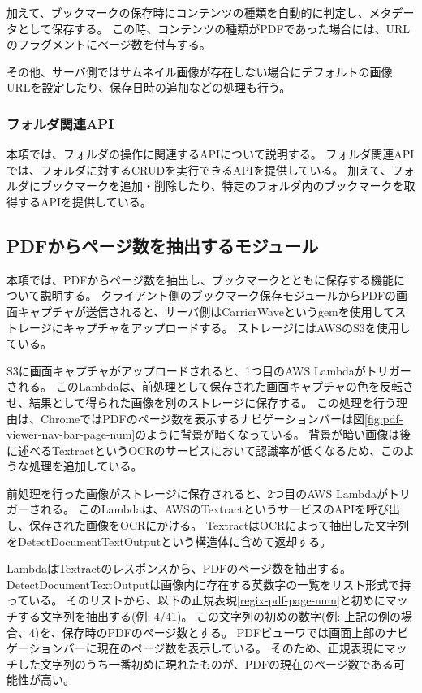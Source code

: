 加えて、ブックマークの保存時にコンテンツの種類を自動的に判定し、メタデータとして保存する。
この時、コンテンツの種類がPDFであった場合には、URLのフラグメントにページ数を付与する。

その他、サーバ側ではサムネイル画像が存在しない場合にデフォルトの画像URLを設定したり、保存日時の追加などの処理も行う。

\subsubsection{フォルダ関連API}
本項では、フォルダの操作に関連するAPIについて説明する。
フォルダ関連APIでは、フォルダに対するCRUDを実行できるAPIを提供している。
加えて、フォルダにブックマークを追加・削除したり、特定のフォルダ内のブックマークを取得するAPIを提供している。

\subsection{PDFからページ数を抽出するモジュール}
本項では、PDFからページ数を抽出し、ブックマークとともに保存する機能について説明する。
クライアント側のブックマーク保存モジュールからPDFの画面キャプチャが送信されると、サーバ側はCarrierWave\cite{carrier-wave}というgemを使用してストレージにキャプチャをアップロードする。
ストレージにはAWSのS3\cite{s3}を使用している。

S3に画面キャプチャがアップロードされると、1つ目のAWS Lambdaがトリガーされる。
このLambdaは、前処理として保存された画面キャプチャの色を反転させ、結果として得られた画像を別のストレージに保存する。
この処理を行う理由は、ChromeではPDFのページ数を表示するナビゲーションバーは図\ref{fig:pdf-viewer-nav-bar-page-num}のように背景が暗くなっている。
背景が暗い画像は後に述べるTextract\cite{textract}というOCRのサービスにおいて認識率が低くなるため、このような処理を追加している。

前処理を行った画像がストレージに保存されると、2つ目のAWS Lambdaがトリガーされる。
このLambdaは、AWSのTextractというサービスのAPIを呼び出し、保存された画像をOCRにかける。
TextractはOCRによって抽出した文字列をDetectDocumentTextOutput\cite{detect-document-text-output}という構造体に含めて返却する。

LambdaはTextractのレスポンスから、PDFのページ数を抽出する。
DetectDocumentTextOutputは画像内に存在する英数字の一覧をリスト形式で持っている。
そのリストから、以下の正規表現\ref{regix-pdf-page-num}と初めにマッチする文字列を抽出する(例: 4/41)。
この文字列の初めの数字(例: 上記の例の場合、4)を、保存時のPDFのページ数とする。
PDFビューワでは画面上部のナビゲーションバーに現在のページ数を表示している。
そのため、正規表現にマッチした文字列のうち一番初めに現れたものが、PDFの現在のページ数である可能性が高い。

